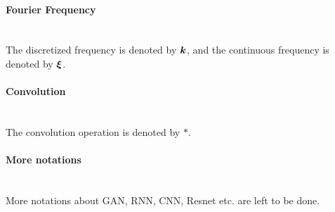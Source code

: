 \documentclass[]{article}
\begin{document}
\paragraph{Fourier Frequency}~\\
The discretized frequency is denoted by $\bm{k}$, and the continuous frequency is denoted by $\bm{\xi}$.

\paragraph{Convolution}~\\
The convolution operation is denoted by $*$.

\paragraph{More notations}~\\
More notations about GAN, RNN, CNN, Resnet etc. are left to be done.
\end{document}
